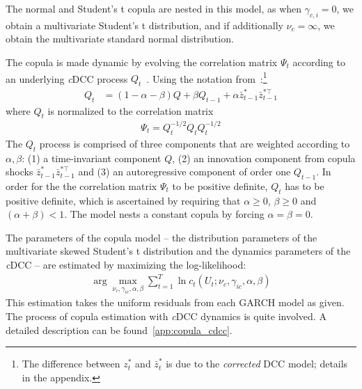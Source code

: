 The normal and Student's t copula are nested in this model, as when $\gamma_{c,i} = 0$, we obtain a multivariate Student's t distribution, and if additionally $\nu_c = \infty$, we obtain the multivariate standard normal distribution.

The copula is made dynamic by evolving the correlation matrix $\Psi_t$ according to an underlying \emph{c}DCC process $Q_t$~\autocites[cf.]{Engle2002,Aielli2013}. Using the notation from~\textcite{ChristoffersenLanglois2013}:\footnote{The difference between ${z_t^*}$ and ${\bar{z}_t^*}$ is due to the \emph{corrected} DCC model; details in the appendix.}
\begin{align}
  Q_t &= (1 - \alpha - \beta) Q
    + \beta Q_{t - 1}
    + \alpha \bar{z}_{t - 1}^* \bar{z}_{t - 1}^{*\top}
  \label{eq:copula_cdcc}
\end{align}
where $Q_t$ is normalized to the correlation matrix
\begin{align}
  \Psi_t = Q_t^{-1/2} Q_t Q_t^{-1/2}
  \label{eq:copula_cdcc_psi}
\end{align}
The $Q_t$ process is comprised of three components that are weighted according to $\alpha, \beta$: (1) a time-invariant component $Q$, (2) an innovation component from copula shocks $\bar{z}_{t-1}^{*} \bar{z}_{t-1}^{*\top}$ and (3) an autoregressive component of order one $Q_{t-1}$. In order for the the correlation matrix $\Psi_t$ to be positive definite, $Q_t$ has to be positive definite, which is ascertained by requiring that $\alpha \geq 0$, $\beta \geq 0$ and $(\alpha + \beta) < 1$. The model nests a constant copula by forcing $\alpha = \beta = 0$.

The parameters of the copula model -- the distribution parameters of the multivariate skewed Student's t distribution and the dynamics parameters of the \emph{c}DCC -- are estimated by maximizing the log-likelihood:
\begin{align}
  \arg\!\max_{\nu_c, \gamma_{ic}, \alpha, \beta} \sum_{t = 1}^T \ln c_t(U_t; \nu_c, \gamma_{ic}, \alpha, \beta)
\end{align}
This estimation takes the uniform residuals from each GARCH model as given. The process of copula estimation with \emph{c}DCC dynamics is quite involved. A detailed description can be found~\autoref{app:copula_cdcc}.

